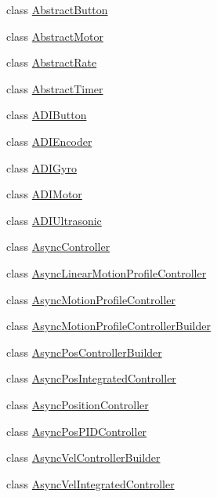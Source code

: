 \begin{DoxyCompactItemize}
\item 
class \mbox{\hyperlink{classokapi_1_1AbstractButton}{Abstract\+Button}}
\item 
class \mbox{\hyperlink{classokapi_1_1AbstractMotor}{Abstract\+Motor}}
\item 
class \mbox{\hyperlink{classokapi_1_1AbstractRate}{Abstract\+Rate}}
\item 
class \mbox{\hyperlink{classokapi_1_1AbstractTimer}{Abstract\+Timer}}
\item 
class \mbox{\hyperlink{classokapi_1_1ADIButton}{A\+D\+I\+Button}}
\item 
class \mbox{\hyperlink{classokapi_1_1ADIEncoder}{A\+D\+I\+Encoder}}
\item 
class \mbox{\hyperlink{classokapi_1_1ADIGyro}{A\+D\+I\+Gyro}}
\item 
class \mbox{\hyperlink{classokapi_1_1ADIMotor}{A\+D\+I\+Motor}}
\item 
class \mbox{\hyperlink{classokapi_1_1ADIUltrasonic}{A\+D\+I\+Ultrasonic}}
\item 
class \mbox{\hyperlink{classokapi_1_1AsyncController}{Async\+Controller}}
\item 
class \mbox{\hyperlink{classokapi_1_1AsyncLinearMotionProfileController}{Async\+Linear\+Motion\+Profile\+Controller}}
\item 
class \mbox{\hyperlink{classokapi_1_1AsyncMotionProfileController}{Async\+Motion\+Profile\+Controller}}
\item 
class \mbox{\hyperlink{classokapi_1_1AsyncMotionProfileControllerBuilder}{Async\+Motion\+Profile\+Controller\+Builder}}
\item 
class \mbox{\hyperlink{classokapi_1_1AsyncPosControllerBuilder}{Async\+Pos\+Controller\+Builder}}
\item 
class \mbox{\hyperlink{classokapi_1_1AsyncPosIntegratedController}{Async\+Pos\+Integrated\+Controller}}
\item 
class \mbox{\hyperlink{classokapi_1_1AsyncPositionController}{Async\+Position\+Controller}}
\item 
class \mbox{\hyperlink{classokapi_1_1AsyncPosPIDController}{Async\+Pos\+P\+I\+D\+Controller}}
\item 
class \mbox{\hyperlink{classokapi_1_1AsyncVelControllerBuilder}{Async\+Vel\+Controller\+Builder}}
\item 
class \mbox{\hyperlink{classokapi_1_1AsyncVelIntegratedController}{Async\+Vel\+Integrated\+Controller}}
\item 

\end{DoxyCompactItemize}
